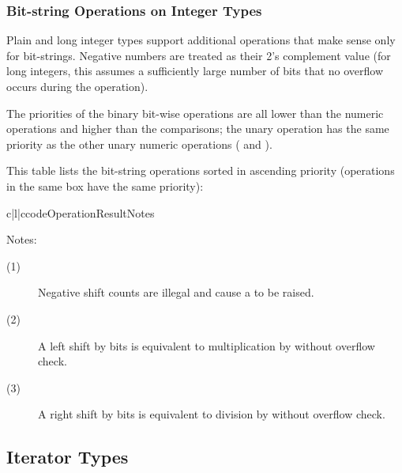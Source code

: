 \subsubsection{Bit-string Operations on Integer Types \label{bitstring-ops}}

Plain and long integer types support additional operations that make
sense only for bit-strings.  Negative numbers are treated as their 2's
complement value (for long integers, this assumes a sufficiently large
number of bits that no overflow occurs during the operation).

The priorities of the binary bit-wise operations are all lower than
the numeric operations and higher than the comparisons; the unary
operation \samp{\~} has the same priority as the other unary numeric
operations (\samp{+} and \samp{-}).

This table lists the bit-string operations sorted in ascending
priority (operations in the same box have the same priority):

\begin{tableiii}{c|l|c}{code}{Operation}{Result}{Notes}
  \hline
\end{tableiii}

\noindent
Notes:
\begin{description}
\item[(1)] Negative shift counts are illegal and cause a
 to be raised.
\item[(2)] A left shift by  bits is equivalent to
multiplication by  without overflow check.
\item[(3)] A right shift by  bits is equivalent to
division by  without overflow check.
\end{description}


\subsection{Iterator Types \label{typeiter}}

